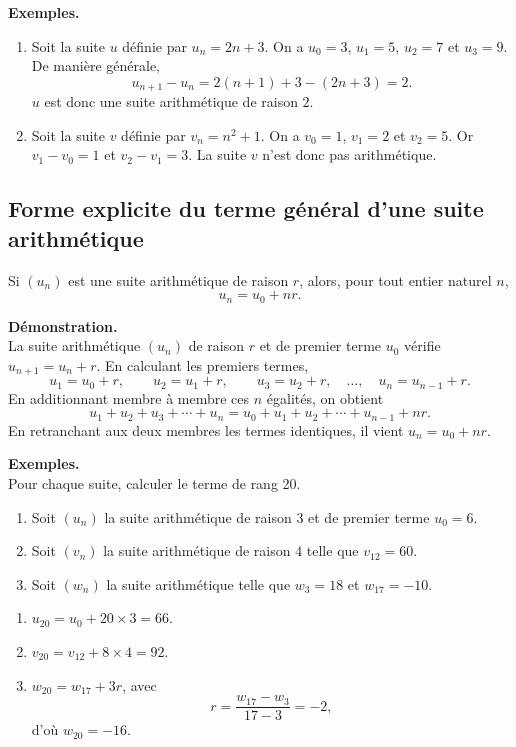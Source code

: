\documentclass[11pt]{article}
\newenvironment{exemples}{\par\smallskip\noindent\textbf{Exemples. \\}\ignorespaces}{\par\smallskip}
\newenvironment{demonstration}{\par\smallskip\noindent\textbf{Démonstration. \\}\ignorespaces}{\par\smallskip}
\begin{document}
\begin{exemples}
\begin{enumerate}[label=\arabic*.]
    \item Soit la suite $u$ définie par $u_n=2n+3$. On a $u_0=3$, $u_1=5$, $u_2=7$ et $u_3=9$. De manière générale,
    \[
    u_{n+1}-u_n=2(n+1)+3-(2n+3)=2.
    \]
    $u$ est donc une suite arithmétique de raison $2$.
    \item Soit la suite $v$ définie par $v_n=n^2+1$. On a $v_0=1$, $v_1=2$ et $v_2=5$. Or $v_1-v_0=1$ et $v_2-v_1=3$. La suite $v$ n'est donc pas arithmétique.
\end{enumerate}
\end{exemples}

\subsection{Forme explicite du terme général d'une suite arithmétique}

\begin{propriete}
Si $(u_n)$ est une suite arithmétique de raison $r$, alors, pour tout entier naturel $n$,
\[
u_n=u_0+nr.
\]
\end{propriete}

\begin{demonstration}
La suite arithmétique $(u_n)$ de raison $r$ et de premier terme $u_0$ vérifie $u_{n+1}=u_n+r$. En calculant les premiers termes,
\[
u_1=u_0+r,\qquad u_2=u_1+r,\qquad u_3=u_2+r,\quad\ldots,\quad u_n=u_{n-1}+r.
\]
En additionnant membre à membre ces $n$ égalités, on obtient
\[
u_1+u_2+u_3+\cdots+u_n=u_0+u_1+u_2+\cdots+u_{n-1}+nr.
\]
En retranchant aux deux membres les termes identiques, il vient $u_n=u_0+nr$.
\end{demonstration}

\begin{exemples}
Pour chaque suite, calculer le terme de rang 20.
\begin{enumerate}[label=\arabic*.]
    \item Soit $(u_n)$ la suite arithmétique de raison $3$ et de premier terme $u_0=6$.
    \item Soit $(v_n)$ la suite arithmétique de raison $4$ telle que $v_{12}=60$.
    \item Soit $(w_n)$ la suite arithmétique telle que $w_3=18$ et $w_{17}=-10$.
\end{enumerate}
\begin{enumerate}[label=\arabic*.]
    \item $u_{20}=u_0+20\times 3=66$.
    \item $v_{20}=v_{12}+8\times 4=92$.
    \item $w_{20}=w_{17}+3r$, avec
    \[
    r=\frac{w_{17}-w_3}{17-3}=-2,
    \]
    d'où $w_{20}=-16$.
\end{enumerate}
\end{exemples}
\end{document}
